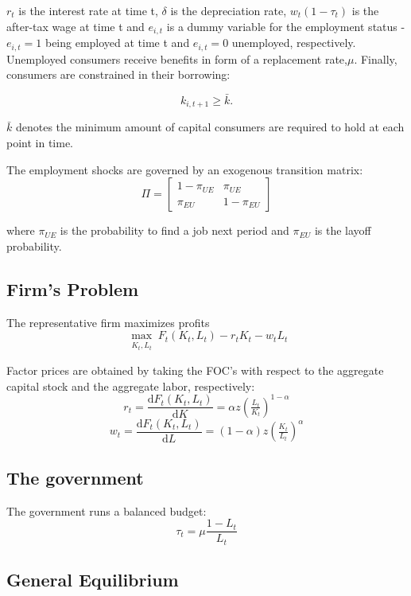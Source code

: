 \documentclass[a4paper,12pt]{article}
\begin{document}
$r_{t}$ is the interest rate at time t, $\delta$ is the depreciation rate, $w_{t}(1-\tau_{t})$ is the after-tax wage at time t and $e_{i,t}$ is a dummy variable for the employment status - $e_{i,t}=1$ being employed at time t and $ e_{i,t}=0$ unemployed, respectively. Unemployed consumers receive benefits in form of a replacement rate,$\mu$. Finally, consumers are constrained in their borrowing:
 
   \begin{equation}
  \label{eq:borconstraint}
   k_{i,t + 1} \geq \bar{k}.
 	 \end{equation}
 	 
$\bar{k}$ denotes the minimum amount of capital consumers are required to hold at each point in time.

The employment shocks are governed by an exogenous transition matrix: 
\[ \Pi = \begin{bmatrix}
1-\pi_{UE} & \pi_{UE} \\
 \pi_{EU} & 1-\pi_{EU}
\end{bmatrix}
\]

where $\pi_{UE}$ is the probability to find a job next period and $\pi_{EU}$ is the layoff probability. 

\subsection{Firm's Problem}

The representative firm maximizes profits 
\[ \max_{\substack{K_{t},L_{t}}}F_{t}(K_{t},L_{t})-r_{t}K_{t}-w_{t}L_{t}
\]

Factor prices are obtained by taking the FOC's with respect to the aggregate capital stock and the aggregate labor, respectively: 
\[
r_{t} = \frac{\mathrm d F_{t}(K_{t},L_{t})}{\mathrm d K} = \alpha z (\tfrac{L_{t}}{K_{t}})^{1-\alpha} \]
\[
w_{t} = \frac{\mathrm d F_{t}(K_{t},L_{t})}{\mathrm d L} =(1-\alpha)z (\tfrac{K_{t}}{L_{t}})^{\alpha}
\]

\subsection{The government}

The government runs a balanced budget:
\begin{equation}
  \label{eq:balancedbudget}
\tau_{t}=\mu\frac{1-L_{t}}{L_{t}}
\end{equation}



\subsection{General Equilibrium}
\end{document}
